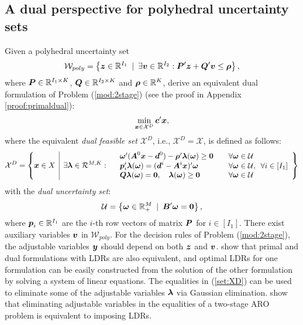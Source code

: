 \documentclass[fleqn,isre,blindrev]{informs4}
\newcommand{\mb}[1]{\mbox{\boldmath \ensuremath{#1}}}
\begin{document}
	\subsection{A dual perspective for polyhedral uncertainty sets}
	\noindent Given a polyhedral uncertainty set
\begin{equation*}
	\mathcal{W}_{poly} = \left\{\mb{z}\in \mathbb{R}^{I_1} \enskip |\enskip \exists \mb{v} \in \mathbb{R}^{I_2}: \mb{P}'\mb{z} + \mb{Q}'\mb{v} \le \mb{\rho} \right\},
\end{equation*}
	where $\mb{P}\in \mathbb{R}^{ I_1 \times K }$, $\mb{Q}\in \mathbb{R}^{ I_2 \times K }$  and  $\mb{\rho}\in \mathbb{R}^{K}$, \cite{bd16} derive an equivalent dual formulation of Problem (\ref{mod:2stage}) (see the proof in Appendix \ref{proof:primaldual}):
\begin{equation}
		\label{mod:2stagedual}
		\min_{\boldsymbol{x} \in \mathcal{X}^D} \mb{c}'\mb{x}, 
\end{equation}
	where the equivalent {\em dual feasible set} $\mathcal{X}^D$, i.e., $\mathcal{X}^D=\mathcal{X}$, is defined as follows:
\begin{equation}
		\label{set:XD}
		\mathcal{X}^D=  \left\{ \mb{x} \in X \enskip \vline \enskip
		\exists \mb{\lambda} \in \mathcal{R}^{M,K}:	\begin{array}{lll}
			&  \mb{\omega}' (\mb{A}^0\mb{x}-\mb{d}^0) - \mb{\rho}'\mb{\lambda}(\mb{\omega}) \ge \mb{0} & \quad  \forall \mb{\omega} \in \mathcal{U}\\
			&\mb{p}_i'\mb{\lambda}(\mb{\omega}) = (\mb{d}^i- \mb{A}^i\mb{x})'\mb{\omega} & \quad  \forall \mb{\omega} \in \mathcal{U}, \enskip \forall i\in [I_1]\\
			&\displaystyle  \mb{Q}\mb{\lambda}(\mb{\omega}) = \mb{0}, \quad  \mb{\lambda}(\mb{\omega}) \ge \mb{0} & \quad \forall \mb{\omega} \in \mathcal{U}
		\end{array}
		\right\}
\end{equation}
	with the {\it dual uncertainty set}:
\begin{equation*}\label{set:U}
	\mathcal{U} = \left\{\mb{\omega}\in \mathbb{R}^{M}_+ \enskip |\enskip \mb{B}'\mb{\omega} = \mb{0} \right\},
\end{equation*}
	where $\mb{p}_i\in \mathbb{R}^{I_1}$ are the $i$-th row vectors of matrix $\mb{P}$ for $i\in [I_1]$.  There exist auxiliary variables $\mb{v}$ in $\mathcal{W}_{poly}$. For the decision rules of Problem (\ref{mod:2stage}), the adjustable variables $\mb{y}$ should depend on both $\mb{z}$ and $\mb{v}$. \cite{bd16} show that primal and dual formulations with LDRs are also equivalent, and optimal LDRs for one formulation can be easily constructed from the solution of the other formulation by solving a system of linear equations. The equalities in (\ref{set:XD}) can be used to eliminate some of the adjustable variables $\mb{\lambda}$ via Gaussian elimination.  {\cite{zd17b} show that eliminating adjustable variables in the equalities of a two-stage ARO problem is equivalent to imposing LDRs.}
	
\end{document}
